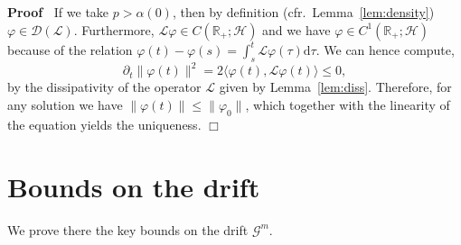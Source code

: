 \documentclass{article}
\newcommand{\mathd}{\mathrm{d}}
\newenvironment{proof}{\noindent\textbf{Proof\ }}{\hspace*{\fill}$\Box$\medskip}
\begin{document}
\begin{proof}
  If we take $p > \alpha (0)$, then by definition
  (cfr.~Lemma~\ref{lem:density}) $\varphi \in \mathcal{D} (\mathcal{L})$.
  Furthermore, $\mathcal{L} \varphi \in C (\mathbb{R}_+ ; \mathcal{H})$ and we
  have $\varphi \in C^1 (\mathbb{R}_+ ; \mathcal{H})$ because of the relation
  $\varphi (t) - \varphi (s) = \int_s^t \mathcal{L} \varphi (\tau) \mathd
  \tau$. We can hence compute,
  \[ \partial_t \| \varphi (t) \|^2 = 2 \langle \varphi (t), \mathcal{L}
     \varphi (t) \rangle \leqslant 0, \]
  by the dissipativity of the operator $\mathcal{L}$ given by
  Lemma~\ref{lem:diss}. Therefore, for any solution we have $\| \varphi (t) \|
  \leqslant \| \varphi_0 \|$, which together with the linearity of the
  equation yields the uniqueness.
\end{proof}

\section{Bounds on the drift}\label{sec:bounds}

We prove there the key bounds on the drift $\mathcal{G}^m$.
\end{document}
